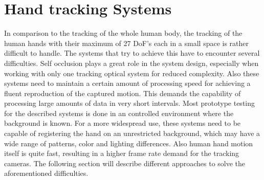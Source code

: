\section{Hand tracking Systems}
\label{hand-tracking_systems}
In comparison to the tracking of the whole human body, the tracking of the human hands with their maximum of 27 DoF's each in a small space is rather difficult to handle.
The systems that try to achieve this have to encounter several difficulties. Self occlusion plays a great role in the system design, especially when working with only one tracking optical system for reduced complexity. Also these systems need to maintain a certain amount of processing speed for achieving a fluent reproduction of the captured motion. This demands the capability of processing large amounts of data in very short intervals. Most prototype testing for the described systems is done in an controlled environment where the background is known. For a more widespread use, these systems need to be capable of registering the hand on an unrestricted background, which may have a wide range of patterns, color and lighting differences. Also human hand motion itself is quite fast, resulting in a higher frame rate demand for the tracking cameras.
The following section will describe different approaches to solve the aforementioned difficulties.

